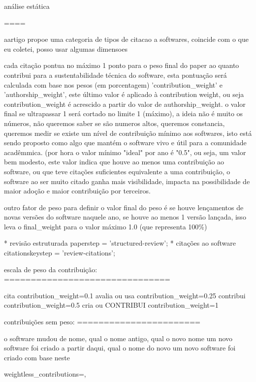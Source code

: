 análise estática


====



aartigo propoe uma categoria de tipos de citacao a softwares,
coincide com o que eu coletei, posso usar algumas dimensoes
\cite{smith2016software}

cada citação pontua no máximo 1 ponto para o peso final do paper ao quanto
contribui para a sustentabilidade técnica do software, esta pontuação será
calculada com base nos pesos (em porcentagem) 'contribution\_weight' e
'authorship\_weight', este último valor é aplicado à contribution weight,
ou seja contribution\_weight é acrescido a partir do valor de authorship\_weight.
o valor final se ultrapassar 1 será cortado no limite 1 (máximo), a ideia não é muito
os números, não queremos saber se são numeros altos, queremos constancia, queremos
medir se existe um nível de contribuição mínimo aos softwares, isto está
sendo proposto como algo que mantém o software vivo e útil para a comunidade
acadêmmica. (por hora o valor mínimo "ideal" por ano é "0.5", ou seja, um
valor bem modesto, este valor indica que houve ao menos uma contribuição
ao software, ou que teve citações suficientes equivalente a uma contribuição,
o software ao ser muito citado ganha mais visibilidade, impacta na possibilidade
de maior adoção e maior contribuição por terceiros.

outro fator de peso para definir o valor final do peso é se houve lençamentos
de novas versões do software naquele ano, se houve ao menos 1 versão lançada,
isso leva o final\_weight para o valor máximo 1.0 (que representa 100\%)

* revisão estruturada
   paper{step} = 'structured-review';
* citações ao software
   citations{key}{step} = 'review-citations';

escala de peso da contribuição:
===============================

cita
  contribution\_weight=0.1
avalia ou usa
  contribution\_weight=0.25
contribui
  contribution\_weight=0.5
cria ou CONTRIBUI
  contribution\_weight=1

contribuições sem peso:
=======================

o software mudou de nome, qual o nome antigo, qual o novo nome
um novo software foi criado a partir daqui, qual o nome do novo
um novo software foi criado com base neste

  weightless\_contributions={},


%
%
%


